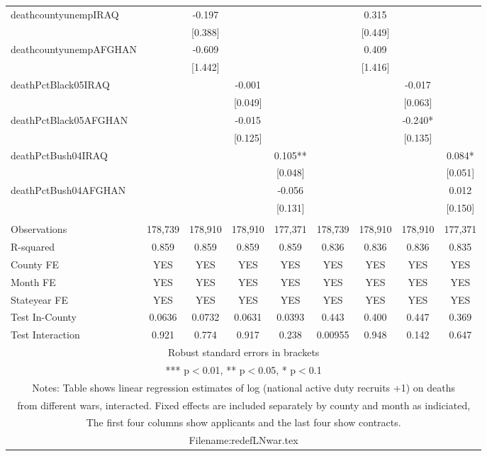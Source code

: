 \documentclass[]{article}
\begin{document}
\begin{tabular}{lcccccccc}
deathcountyunempIRAQ &  & -0.197 &  &  &  & 0.315 &  &  \\
 &  & [0.388] &  &  &  & [0.449] &  &  \\
deathcountyunempAFGHAN &  & -0.609 &  &  &  & 0.409 &  &  \\
 &  & [1.442] &  &  &  & [1.416] &  &  \\
deathPctBlack05IRAQ &  &  & -0.001 &  &  &  & -0.017 &  \\
 &  &  & [0.049] &  &  &  & [0.063] &  \\
deathPctBlack05AFGHAN &  &  & -0.015 &  &  &  & -0.240* &  \\
 &  &  & [0.125] &  &  &  & [0.135] &  \\
deathPctBush04IRAQ &  &  &  & 0.105** &  &  &  & 0.084* \\
 &  &  &  & [0.048] &  &  &  & [0.051] \\
deathPctBush04AFGHAN &  &  &  & -0.056 &  &  &  & 0.012 \\
 &  &  &  & [0.131] &  &  &  & [0.150] \\
 &  &  &  &  &  &  &  &  \\
Observations & 178,739 & 178,910 & 178,910 & 177,371 & 178,739 & 178,910 & 178,910 & 177,371 \\
R-squared & 0.859 & 0.859 & 0.859 & 0.859 & 0.836 & 0.836 & 0.836 & 0.835 \\
County FE & YES & YES & YES & YES & YES & YES & YES & YES \\
Month FE & YES & YES & YES & YES & YES & YES & YES & YES \\
Stateyear FE & YES & YES & YES & YES & YES & YES & YES & YES \\
Test In-County & 0.0636 & 0.0732 & 0.0631 & 0.0393 & 0.443 & 0.400 & 0.447 & 0.369 \\
 Test Interaction & 0.921 & 0.774 & 0.917 & 0.238 & 0.00955 & 0.948 & 0.142 & 0.647 \\ \hline
\multicolumn{9}{c}{ Robust standard errors in brackets} \\
\multicolumn{9}{c}{ *** p$<$0.01, ** p$<$0.05, * p$<$0.1} \\
\multicolumn{9}{c}{ Notes: Table shows linear regression estimates of log (national active duty recruits +1) on deaths} \\
\multicolumn{9}{c}{ from different wars, interacted. Fixed effects are included separately by county and month as indiciated,} \\
\multicolumn{9}{c}{ The first four columns show applicants and the last four show contracts.} \\
\multicolumn{9}{c}{ Filename:redefLNwar.tex} \\
\end{tabular}
\end{document}

